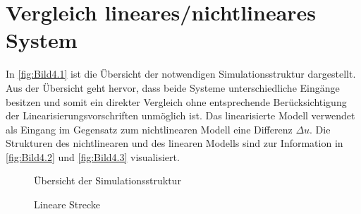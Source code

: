 \pagestyle{aaron}
\section{Vergleich lineares/nichtlineares System} \label{sec:Vergleich}

In \autoref{fig:Bild4.1} ist die Übersicht der notwendigen Simulationsstruktur dargestellt. Aus der Übersicht geht hervor, dass beide Systeme unterschiedliche Eingänge besitzen und somit ein direkter Vergleich ohne entsprechende Berücksichtigung der Linearisierungsvorschriften unmöglich ist. Das linearisierte Modell verwendet als Eingang im Gegensatz zum nichtlinearen Modell eine Differenz $\Delta u$. Die Strukturen des nichtlinearen und des linearen Modells sind zur Information in \autoref{fig:Bild4.2} und \autoref{fig:Bild4.3} visualisiert.

\begin{figure}[H]
   \centering
   \caption[Übersicht der Simulationsstruktur]{Übersicht der Simulationsstruktur}
   \label{fig:Bild4.1}
\end{figure}

\begin{figure}[H]
   \centering
   \caption[Lineare Strecke]{Lineare Strecke}
   \label{fig:Bild4.2}
\end{figure}

